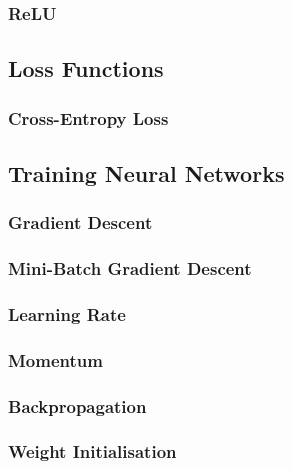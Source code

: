             \subsubsection{ReLU}
            
        \subsection{Loss Functions}
            
            \subsubsection{Cross-Entropy Loss}
        
        \subsection{Training Neural Networks}
            
            \subsubsection{Gradient Descent}
            
            \subsubsection{Mini-Batch Gradient Descent}
            
            \subsubsection{Learning Rate}
            
            \subsubsection{Momentum}
            
            \subsubsection{Backpropagation}
            
            \subsubsection{Weight Initialisation}
            
            \lipsum[1-2]
    

